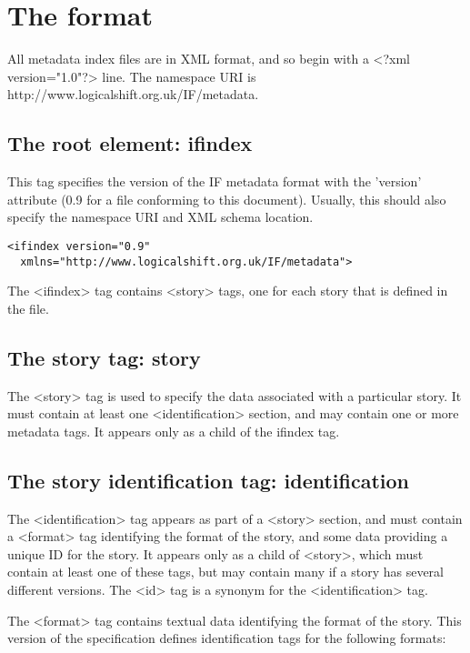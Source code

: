 \documentclass[a4paper,11pt]{article}
\begin{document}
\section{The format}

All metadata index files are in XML format, and so begin with a <?xml version="1.0"?>
line. The namespace URI is http://www.logicalshift.org.uk/IF/metadata.

\subsection{The root element: ifindex}

This tag specifies the version of the IF metadata format with the 'version' attribute (0.9 for a
file conforming to this document). Usually, this should also specify the namespace URI
and XML schema location.

\begin{example}
  \begin{verbatim}
<ifindex version="0.9"
  xmlns="http://www.logicalshift.org.uk/IF/metadata">
  \end{verbatim}
\end{example}

The <ifindex> tag contains <story> tags, one for each story that is defined in the file.

\subsection{The story tag: story}

The <story> tag is used to specify the data associated with a particular story. It must contain
at least one <identification> section, and may contain one or more metadata tags. It appears
only as a child of the ifindex tag.

\subsection{The story identification tag: identification}

The <identification> tag appears as part of a <story> section, and must contain a <format>
tag identifying the format of the story, and some data providing a unique ID for the story.
It appears only as a child of <story>, which must contain at least one of these tags, but
may contain many if a story has several different versions. The <id> tag is a synonym for
the <identification> tag.

The <format> tag contains textual data identifying the format of the story. This version
of the specification defines identification tags for the following formats:
\end{document}
